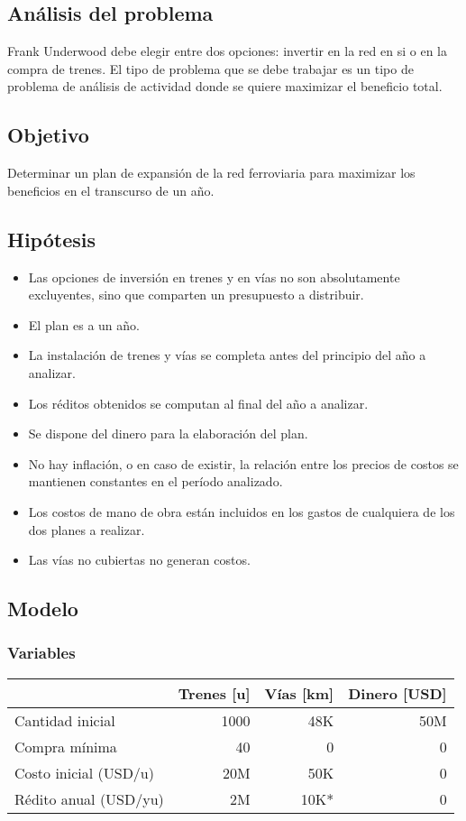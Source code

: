 \documentclass[10pt, a4paper, titlepage,
	oneside,
	fleqn, leqno]{article}
\begin{document}
\subsection{Análisis del problema}
Frank Underwood debe elegir entre dos opciones: invertir en la red en si o en la compra de trenes.
El tipo de problema que se debe trabajar es un tipo de problema de análisis de actividad donde se quiere maximizar el beneficio total.
\subsection{Objetivo}
Determinar un plan de expansión de la red ferroviaria para maximizar los beneficios en el transcurso de un año.

\subsection{Hipótesis}
\begin{itemize}
 \item Las opciones de inversión en trenes y en vías no son absolutamente excluyentes, sino que comparten un presupuesto a distribuir.
 \item El plan es a un año.
 \item La instalación de trenes y vías se completa antes del principio del año a analizar.
 \item Los réditos obtenidos se computan al final del año a analizar.
 \item Se dispone del dinero para la elaboración del plan.
 \item No hay inflación, o en caso de existir, la relación entre los precios de costos se mantienen constantes en el período analizado.
 \item Los costos de mano de obra están incluidos en los gastos de cualquiera de los dos planes a realizar.
 \item Las vías no cubiertas no generan costos.
\end{itemize}

\subsection{Modelo}
\subsubsection{Variables}

\begin{tabular}{|l|r|r|r|} \hline
    & Trenes [u] & Vías [km] & Dinero [USD]\\ \hline
  Cantidad inicial & 1000 & 48K & 50M\\ \hline
  Compra mínima & 40 & 0 & 0\\ \hline
  Costo inicial (USD/u) & 20M & 50K & 0\\ \hline
  Rédito anual (USD/yu) & 2M & 10K* & 0\\ \hline
\end{tabular}
\end{document}
